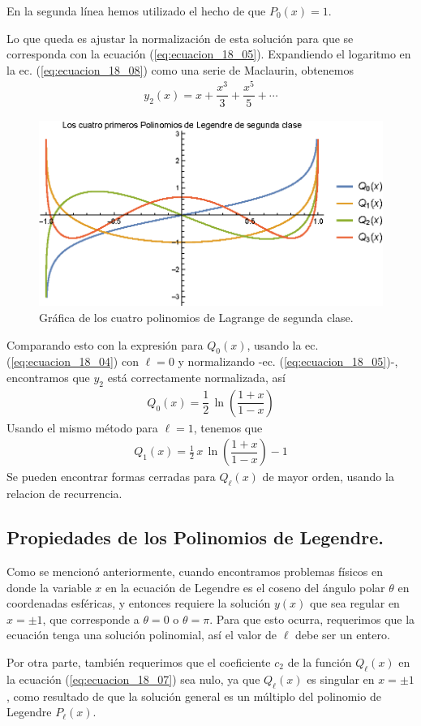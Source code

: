 En la segunda línea hemos utilizado el hecho de que $P_{0}(x)=1$.
\par
Lo que queda es ajustar la normalización de esta solución para que se corresponda con la ecuación (\ref{eq:ecuacion_18_05}). Expandiendo el logaritmo en la ec. (\ref{eq:ecuacion_18_08}) como una serie de Maclaurin, obtenemos
\begin{align*}
y_{2}(x) = x + \dfrac{x^{3}}{3} + \dfrac{x^{5}}{5} + \cdots \end{align*}
\begin{figure}[H]
    \centering
    \includegraphics[scale=1]{Imagenes/Plot_LagrangeSC_0-4.eps}
    \caption{Gráfica de los cuatro polinomios de Lagrange de segunda clase.}
    \label{fig:polinomios_Lagrange_02}
\end{figure}
Comparando esto con la expresión para $Q_{0}(x)$, usando la ec. (\ref{eq:ecuacion_18_04}) con $\ell = 0$ y normalizando -ec. (\ref{eq:ecuacion_18_05})-, encontramos que $y_{2}$ está correctamente normalizada, así
\begin{align*}
Q_{0} (x) = \dfrac{1}{2} \, \ln \left( \dfrac{1 + x}{1 - x} \right)
\end{align*}
Usando el mismo método para $\ell = 1$, tenemos que
\begin{align*}
Q_{1} (x) =  \frac{1}{2} \, x \,  \ln \left( \dfrac{1 + x}{1 - x} \right) - 1
\end{align*}
Se pueden encontrar formas cerradas para $Q_{\ell}(x)$ de mayor orden, usando la relacion de recurrencia.
\subsection{Propiedades de los Polinomios de Legendre.}
Como se mencionó anteriormente, cuando encontramos problemas físicos en donde la variable $x$ en la ecuación de Legendre es el coseno del ángulo polar $\theta$ en coordenadas esféricas, y entonces requiere la solución $y(x)$ que sea regular en $x = \pm 1$, que corresponde a $\theta = 0$ o $\theta = \pi$. Para que esto ocurra, requerimos que la ecuación tenga una solución polinomial, así el valor de $\ell$ debe ser un entero.
\par
Por otra parte, también requerimos que el coeficiente $c_{2}$ de la función $Q_{\ell}(x)$ en la ecuación (\ref{eq:ecuacion_18_07}) sea nulo, ya que $Q_{\ell}(x)$ es singular en $x = \pm 1$, como resultado de que la solución general es un múltiplo del polinomio de Legendre $P_{\ell}(x)$.
